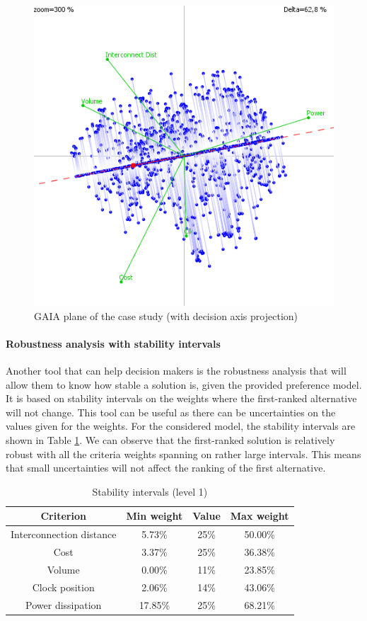 \begin{figure}[h!]
\begin{center}
\includegraphics[width=0.8\linewidth]{gva804stick}
\end{center}
\caption{GAIA plane of the case study (with decision axis projection)}
\label{fig:gva804stick}
\end{figure}

\paragraph{Robustness analysis with stability intervals}
Another tool that can help decision makers is the robustness analysis that will allow them to know how stable a solution is, given the provided preference model. It is based on stability intervals on the weights where the first-ranked alternative will not change. This tool can be useful as there can be uncertainties on the values given for the weights. For the considered model, the stability intervals are shown in Table \ref{tab:stability}. We can observe that the first-ranked solution is relatively robust with all the criteria weights spanning on rather large intervals. This means that small uncertainties will not affect the ranking of the first alternative.

\begin{table}[h!]
\caption{Stability intervals (level 1)}
\begin{center}
\begin{tabular}{|c|c|c|c|}
\hline
Criterion & Min weight & Value  & Max weight \\
\hline
Interconnection distance & 5.73\% & 25\% & 50.00\% \\
Cost & 3.37\% & 25\% & 36.38\% \\
Volume & 0.00\% & 11\% & 23.85\% \\
Clock position & 2.06\% & 14\% & 43.06\% \\
Power dissipation & 17.85\% & 25\% & 68.21\% \\
\hline
\end{tabular}
\end{center}
\label{tab:stability}
\end{table}

